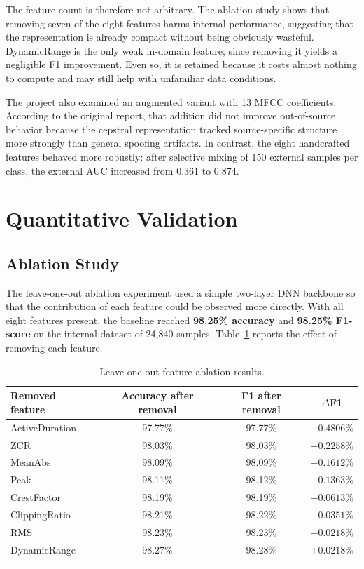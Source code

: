 \documentclass[pdflatex,sn-mathphys-num]{sn-jnl}
\begin{document}
The feature count is therefore not arbitrary. The ablation study shows that removing seven of the eight features harms internal performance, suggesting that the representation is already compact without being obviously wasteful. DynamicRange is the only weak in-domain feature, since removing it yields a negligible F1 improvement. Even so, it is retained because it costs almost nothing to compute and may still help with unfamiliar data conditions.

The project also examined an augmented variant with 13 MFCC coefficients. According to the original report, that addition did not improve out-of-source behavior because the cepstral representation tracked source-specific structure more strongly than general spoofing artifacts. In contrast, the eight handcrafted features behaved more robustly: after selective mixing of 150 external samples per class, the external AUC increased from 0.361 to 0.874.

\section{Quantitative Validation}\label{sec:validation}

\subsection{Ablation Study}

The leave-one-out ablation experiment used a simple two-layer DNN backbone so that the contribution of each feature could be observed more directly. With all eight features present, the baseline reached \textbf{98.25\% accuracy} and \textbf{98.25\% F1-score} on the internal dataset of 24{,}840 samples. Table~\ref{tab:ablation} reports the effect of removing each feature.

\begin{table}[htbp]
\caption{Leave-one-out feature ablation results.}
\label{tab:ablation}
\centering
\small
\begin{tabular}{lccc}
\toprule
\textbf{Removed feature} & \textbf{Accuracy after removal} & \textbf{F1 after removal} & \textbf{$\Delta$F1} \\
\midrule
ActiveDuration & 97.77\% & 97.77\% & $-0.4806\%$ \\
ZCR & 98.03\% & 98.03\% & $-0.2258\%$ \\
MeanAbs & 98.09\% & 98.09\% & $-0.1612\%$ \\
Peak & 98.11\% & 98.12\% & $-0.1363\%$ \\
CrestFactor & 98.19\% & 98.19\% & $-0.0613\%$ \\
ClippingRatio & 98.21\% & 98.22\% & $-0.0351\%$ \\
RMS & 98.23\% & 98.23\% & $-0.0218\%$ \\
DynamicRange & 98.27\% & 98.28\% & $+0.0218\%$ \\
\botrule
\end{tabular}
\end{table}
\end{document}
